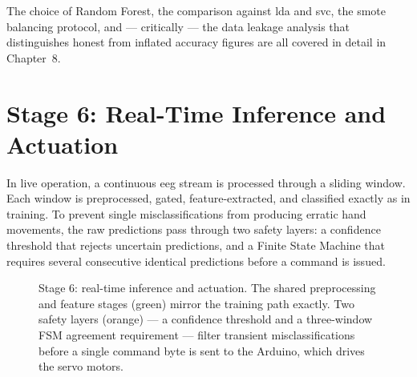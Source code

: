 The choice of Random Forest, the comparison against \acrshort{lda}
and \acrshort{svc}, the \acrshort{smote} balancing protocol, and ---
critically --- the data leakage analysis that distinguishes honest
from inflated accuracy figures are all covered in detail in
Chapter~8.

\section{Stage 6: Real-Time Inference and Actuation}
\label{sec:mo_inference}

In live operation, a continuous \acrshort{eeg} stream is processed
through a sliding window. Each window is preprocessed, gated,
feature-extracted, and classified exactly as in training. To prevent
single misclassifications from producing erratic hand movements, the
raw predictions pass through two safety layers: a confidence
threshold that rejects uncertain predictions, and a Finite State
Machine that requires several consecutive identical predictions
before a command is issued.

\begin{figure}[htbp]
\centering
{}
\caption{Stage 6: real-time inference and actuation. The shared
preprocessing and feature stages (green) mirror the training path
exactly. Two safety layers (orange) --- a confidence threshold and a
three-window FSM agreement requirement --- filter transient
misclassifications before a single command byte is sent to the
Arduino, which drives the servo motors.}
\label{fig:mo_inference}
\end{figure}


